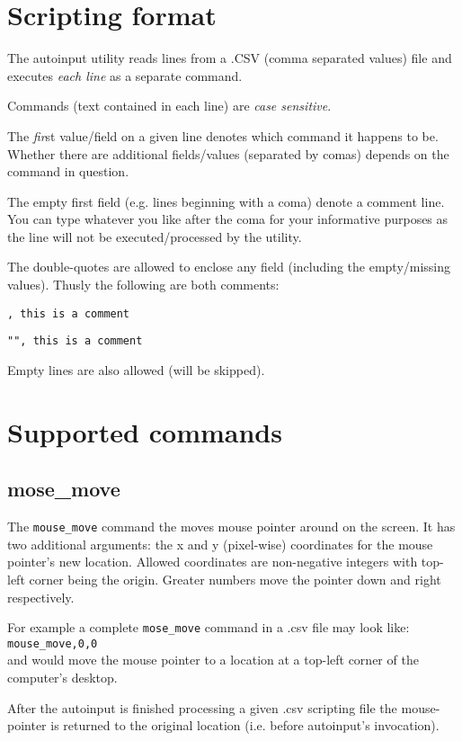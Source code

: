 \documentclass[12pt,a4paper]{article}
\begin{document}
\section{Scripting format}

The autoinput utility reads lines from a .CSV (comma separated values) file and executes \textit{each line} as a separate command.

Commands (text contained in each line) are \textit{case sensitive}.

The \textit{fir}st value/field on a given line denotes which command it happens to be. Whether there are additional  fields/values (separated by comas) depends on the command in question.

The empty first field (e.g. lines beginning with a coma) denote a comment line. You can type whatever you like after the coma for your informative purposes as the line will not be executed/processed by the utility.


The double-quotes are allowed to enclose any field (including the empty/missing values). Thusly the following are both comments:

\texttt{, this is a comment}

\texttt{"", this is a comment}

Empty lines are also allowed (will be skipped).

\section{Supported commands}

\subsection{mose\_move}
The \texttt{mouse\_move} command the moves mouse pointer around on the screen. It has two additional arguments: the x and y (pixel-wise) coordinates for the mouse pointer's new location. Allowed coordinates are non-negative integers with top-left corner being the origin. Greater numbers move the pointer down and right respectively.

For example a complete \texttt{mose\_move} command in a .csv file may look like: \\
\texttt{mouse\_move,0,0} \\
and would move the mouse pointer to a location at a top-left corner of the computer's desktop. 

After the autoinput is finished processing a given .csv scripting file the mouse-pointer is returned to the original location (i.e. before autoinput's invocation).
\end{document}

